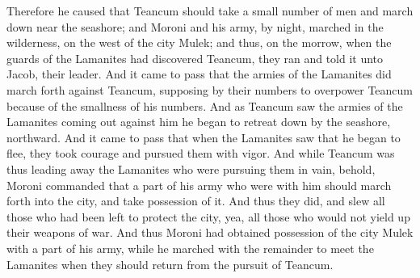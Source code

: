 \bverse \iffalse Therefore he caused that Teancum should take a small number of men and march down near the seashore; and Moroni and his army, by night, marched in the wilderness, on the west of the city Mulek; and thus, on the morrow, when the guards of the Lamanites had discovered Teancum, they ran and told it unto Jacob, their leader. \fi
Therefore he caused that Teancum should take a small number of men and march down near the seashore; and Moroni and his army, by night, marched in the wilderness, on the west of the city Mulek; and thus, on the morrow, when the guards of the Lamanites had discovered Teancum, they ran and told it unto Jacob, their leader.
\bverse \iffalse And it came to pass that the armies of the Lamanites did march forth against Teancum, supposing by their numbers to overpower Teancum because of the smallness of his numbers. And as Teancum saw the armies of the Lamanites coming out against him he began to retreat down by the seashore, northward. \fi
And it came to pass that the armies of the Lamanites did march forth against Teancum, supposing by their numbers to overpower Teancum because of the smallness of his numbers. And as Teancum saw the armies of the Lamanites coming out against him he began to retreat down by the seashore, northward.
\bverse \iffalse And it came to pass that when the Lamanites saw that he began to flee, they took courage and pursued them with vigor. And while Teancum was thus leading away the Lamanites who were pursuing them in vain, behold, Moroni commanded that a part of his army who were with him should march forth into the city, and take possession of it. \fi
And it came to pass that when the Lamanites saw that he began to flee, they took courage and pursued them with vigor. And while Teancum was thus leading away the Lamanites who were pursuing them in vain, behold, Moroni commanded that a part of his army who were with him should march forth into the city, and take possession of it.
\bverse \iffalse And thus they did, and slew all those who had been left to protect the city, yea, all those who would not yield up their weapons of war. \fi
And thus they did, and slew all those who had been left to protect the city, yea, all those who would not yield up their weapons of war.
\bverse \iffalse And thus Moroni had obtained possession of the city Mulek with a part of his army, while he marched with the remainder to meet the Lamanites when they should return from the pursuit of Teancum. \fi
And thus Moroni had obtained possession of the city Mulek with a part of his army, while he marched with the remainder to meet the Lamanites when they should return from the pursuit of Teancum.
